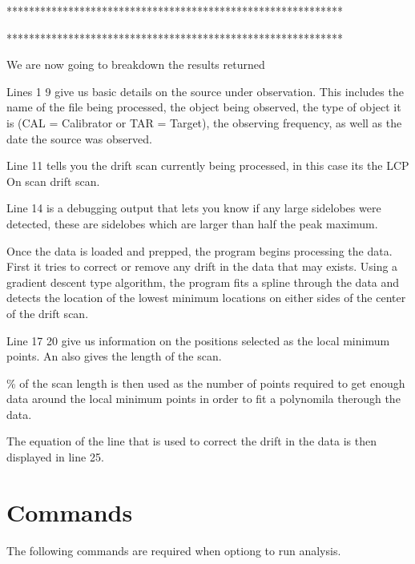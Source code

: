\documentclass[letterpaper,10pt,english]{sphinxmanual}
\begin{document}
\begin{sphinxVerbatim}[commandchars=\\\{\},numbers=left,firstnumber=1,stepnumber=1]
************************************************************


************************************************************


\end{sphinxVerbatim}

\sphinxAtStartPar
We are now going to breakdown the results returned

\sphinxAtStartPar
Lines 1 \sphinxhyphen{} 9 give us basic details on the source under observation.
This includes the name of the file being processed, the object
being observed, the type of object it is (CAL = Calibrator or
TAR = Target), the observing frequency, as well as the date the
source was observed.

\sphinxAtStartPar
Line 11 tells you the drift scan currently being processed, in this
case its the LCP On scan drift scan.

\sphinxAtStartPar
Line 14 is a debugging output that lets you know if any large sidelobes
were detected, these are sidelobes which are larger than half the peak
maximum.

\sphinxAtStartPar
Once the data is loaded and prepped, the program begins processing
the data. First it tries to correct or remove any drift in the data
that may exists. Using a gradient descent type algorithm, the program
fits a spline through the data and detects the location of the lowest
minimum locations on either sides of the center of the drift scan.

\sphinxAtStartPar
Line 17 \sphinxhyphen{} 20 give us information on the positions selected as the
local minimum points. An also gives the length of the scan.

\% of the scan length is then used as the number of points required to
get enough data around the local minimum points in order to fit a
polynomila therough the data.

\sphinxAtStartPar
The equation of the line that is used to correct the drift in the data
is then displayed in line 25.

\sphinxstepscope


\section{Commands}
\label{\detokenize{extras/commands:commands}}\label{\detokenize{extras/commands::doc}}
\sphinxAtStartPar
The following commands are required when optiong to
run  analysis.
\end{document}
